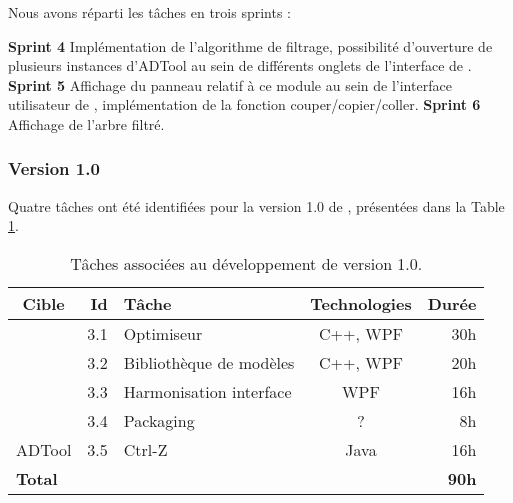             Nous avons réparti les tâches en trois sprints :

            \noindent\textbf{Sprint 4} Implémentation de l'algorithme de filtrage, possibilité d'ouverture de plusieurs instances d'ADTool au sein de différents onglets de l'interface de \glasir{}.\newline 
            \textbf{Sprint 5} Affichage du panneau relatif à ce module au sein de l'interface utilisateur de \glasir{}, implémentation de la fonction couper/copier/coller.\newline %
            \textbf{Sprint 6} Affichage de l'arbre filtré.

        \subsubsection{Version 1.0}
            Quatre tâches ont été identifiées pour la version 1.0 de \glasir{}, présentées dans la {\sc Table} \ref{tab:taches_units_3}.
            \begin{table}[h]
                \centering
                \begin{tabular}{|c|r|l|c|r|}
                    \hline
                    \textbf{Cible} & \textbf{Id} & \textbf{Tâche} & \textbf{Technologies} & \textbf{Durée}\\
                    \hline

                    \multirow{4}{*}{\glasir{}} & 3.1 & Optimiseur & C++, WPF & 30h\\
                    \cline{2-5}
                     & 3.2 & Bibliothèque de modèles & C++, WPF & 20h\\
                    \cline{2-5}
                     & 3.3 & Harmonisation interface & WPF & 16h\\
                    \cline{2-5}
                     & 3.4 & Packaging & ? & 8h\\
                    \hline

                    \multirow{1}{*}{ADTool} & 3.5 & Ctrl-Z & \multirow{1}{*}{Java} & 16h\\
                    \hline

                    \multicolumn{4}{|l|}{\bf Total} & {\bf 90h}\\
                    \hline
                \end{tabular}
                \caption{Tâches associées au développement de \glasir{} version 1.0.}
                \label{tab:taches_units_3}
            \end{table}
            
